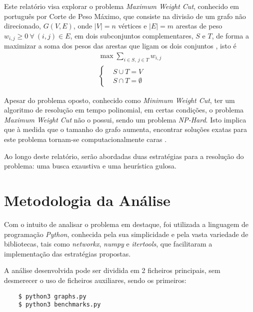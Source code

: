 \documentclass[mirror]{revdetua}
\begin{document}
Este relatório visa explorar o problema \textit{Maximum Weight Cut}, conhecido em português por Corte de Peso Máximo, que consiste na divisão de um grafo não direcionado, $G(V, E)$, onde $|V| = n$ vértices e $|E| = m$ arestas de peso $w_{i,j} \geq 0\ \forall\ (i,j) \in E$, em dois subconjuntos complementares, $S$ e $T$, de forma a maximizar a soma dos pesos das arestas que ligam os dois conjuntos \cite{SC03}, isto é
\begin{equation*}
    \begin{split}
        \max \sum_{i \in S,\ j \in T} w_{i,j} \\ 
        \left\{\begin{split}
            &S \cup T = V \\
            &S \cap T = \emptyset
        \end{split}\right.
    \end{split}
\end{equation*}

Apesar do problema oposto, conhecido como \textit{Minimum Weight Cut}, ter um algoritmo de resolução em tempo polinomial, em certas condições, o problema \textit{Maximum Weight Cut} não o possui, sendo um problema \textit{NP-Hard}. Isto implica que à medida que o tamanho do grafo aumenta, encontrar soluções exatas para este problema tornam-se computacionalmente caras \cite{SS23}.

Ao longo deste relatório, serão abordadas duas estratégias para a resolução do problema: uma busca exaustiva e uma heurística gulosa.


\section{Metodologia da Análise}

Com o intuito de analisar o problema em destaque, foi utilizada a linguagem de programação \textit{Python}, conhecida pela sua simplicidade e pela vasta variedade de bibliotecas, tais como \textit{networkx}, \textit{numpy} e \textit{itertools}, que facilitaram a implementação das estratégias propostas.

A análise desenvolvida pode ser dividida em 2 ficheiros principais, sem desmerecer o uso de ficheiros auxiliares, sendo os primeiros:
\begin{verbatim}
    $ python3 graphs.py
    $ python3 benchmarks.py
\end{verbatim}
\end{document}
